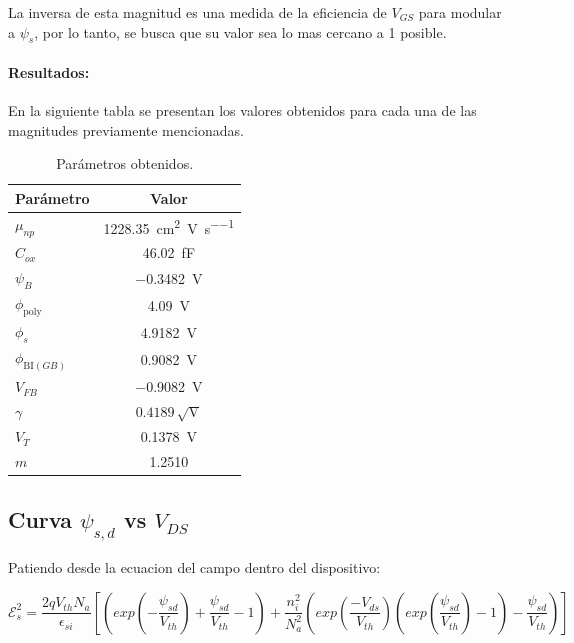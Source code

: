 \documentclass[a4paper, twoside, 10pt, spanish]{article}
\numberwithin{table}{section}
\begin{document}
La inversa de esta magnitud es una medida de la eficiencia de $V_{GS}$ para modular a $\psi_s$, por lo tanto, se busca que su valor sea lo mas cercano a 1 posible.

\paragraph{Resultados:}

En la siguiente tabla se presentan los valores obtenidos para cada una de las magnitudes previamente mencionadas.

\begin{table}[H]
	\centering
	\renewcommand{\arraystretch}{1.3}
	\caption{Parámetros obtenidos.}
	\begin{tabular}{lc}
		\toprule
		\textbf{Parámetro} & \textbf{Valor} \\
		\midrule
		$\mu_{np}$ & \SI{1228.35}{\centi\meter\squared\per\volt\per\second} \\
		$C_{ox}$ & \SI{46.02}{\femto\farad} \\
		$\psi_B$ & \SI{-0.3482}{\volt} \\
		$\phi_{\mathrm{poly}}$ & \SI{4.09}{\volt} \\
		$\phi_s$ & \SI{4.9182}{\volt} \\
		$\phi_{\mathrm{BI}(GB)}$ & \SI{0.9082}{\volt} \\
		$V_{FB}$ & \SI{-0.9082}{\volt} \\
		$\gamma$ & $0.4189\,\sqrt{\si{\volt}}$ \\
		$V_T$ & \SI{0.1378}{\volt} \\
		$m$ & \num{1.2510} \\
		\bottomrule
	\end{tabular}
\end{table}

\subsection{Curva $\psi_{s,d}$ vs $V_{DS}$}

\quad Patiendo desde la ecuacion del campo dentro del dispositivo: 

\begin{equation}\label{eq_campo_cuad}
	\mathscr{E}_s^2 = \frac{2q V_{th} N_a}{\epsilon_{si}} \left[ \left( exp(-\frac{\psi_{sd}}{V_{th}}) + \frac{\psi_{sd}}{V_{th}} -1 \right) + \frac{n_i^2}{N_a ^2}\left( exp\left( \frac{-V_{ds}}{V_{th}} \right) \left( exp \left( \frac{\psi_{sd}}{V_{th}}\right) -1\right) - \frac{\psi_{sd}}{V_{th}} \right) \right]
\end{equation}
\end{document}
